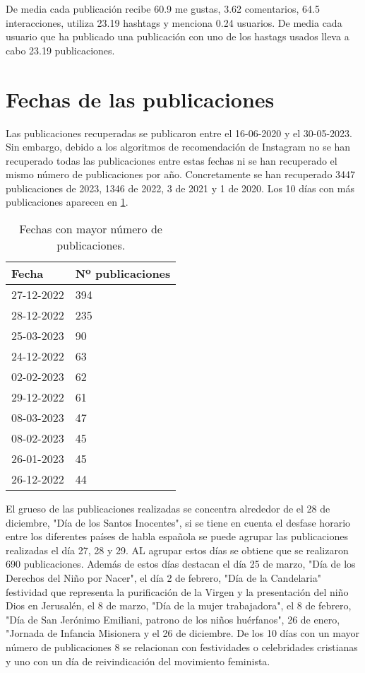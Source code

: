 \documentclass{article}
\begin{document}
De media cada publicación recibe 60.9 me gustas, 3.62 comentarios, 64.5 interacciones, utiliza 23.19 hashtags y menciona 0.24 usuarios. De media cada usuario que ha publicado una publicación con uno de los hastags usados lleva a cabo 23.19 publicaciones.

\section{Fechas de las publicaciones}
Las publicaciones recuperadas se publicaron entre el 16-06-2020 y el 30-05-2023. Sin embargo, debido a los algoritmos de recomendación de Instagram no se han recuperado todas las publicaciones entre estas fechas ni se han recuperado el mismo número de publicaciones por año. Concretamente se han recuperado 3447 publicaciones de 2023, 1346 de 2022, 3 de 2021 y 1 de 2020.
Los 10 días con más publicaciones aparecen en \ref{tab:fechasPublicaciones}.

\begin{table}[ht!]
\centering
\begin{tabular}{|l|l|}
\hline
Fecha      & Nº publicaciones \\ \hline
27-12-2022 & 394              \\ \hline
28-12-2022 & 235              \\ \hline
25-03-2023 & 90               \\ \hline
24-12-2022 & 63               \\ \hline
02-02-2023 & 62               \\ \hline
29-12-2022 & 61               \\ \hline
08-03-2023 & 47               \\ \hline
08-02-2023 & 45               \\ \hline
26-01-2023 & 45               \\ \hline
26-12-2022 & 44               \\ \hline
\end{tabular}
\caption{Fechas con mayor número de publicaciones.}
\label{tab:fechasPublicaciones}
\end{table}

El grueso de las publicaciones realizadas se concentra alrededor de el 28 de diciembre, "Día de los Santos Inocentes", si se tiene en cuenta el desfase horario entre los diferentes países de habla española se puede agrupar las publicaciones realizadas el día 27, 28 y 29. AL agrupar estos días se obtiene que se realizaron 690 publicaciones. Además de estos días destacan el día 25 de marzo, "Día de los Derechos del Niño por Nacer", el día 2 de febrero, "Día de la Candelaria" festividad que representa la purificación de la Virgen y la presentación del niño Dios en Jerusalén, el 8 de marzo, "Día de la mujer trabajadora", el 8 de febrero, "Día de San Jerónimo Emiliani, patrono de los niños huérfanos", 26 de enero, "Jornada de Infancia Misionera y el 26 de diciembre. De los 10 días con un mayor número de publicaciones 8 se relacionan con festividades o celebridades cristianas y uno con un día de reivindicación del movimiento feminista.
\end{document}
